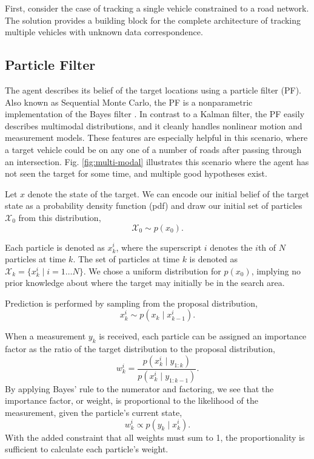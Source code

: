 \documentclass[letterpaper, 10 pt, conference]{ieeeconf}  %
\begin{document}
First, consider the case of tracking a single vehicle constrained to a road network. The solution provides a building block for the complete architecture of tracking multiple vehicles with unknown data correspondence.

\subsection{Particle Filter}

The agent describes its belief of the target locations using a particle filter (PF). Also known as Sequential Monte Carlo, the PF is a nonparametric implementation of the Bayes filter \cite{Arulampalam2002}. In contrast to a Kalman filter, the PF easily describes multimodal distributions, and it cleanly handles nonlinear motion and measurement models. These features are especially helpful in this scenario, where a target vehicle could be on any one of a number of roads after passing through an intersection. Fig. \ref{fig:multi-modal} illustrates this scenario where the agent has not seen the target for some time, and multiple good hypotheses exist.

Let $x$ denote the state of the target. We can encode our initial belief of the target state as a probability density function (pdf) and draw our initial set of particles $\mathcal{X}_0$ from this distribution,
\begin{equation}%
    \mathcal{X}_0 \sim p(x_0).
\end{equation}

Each particle is denoted as $x^i_k$, where the superscript $i$ denotes the $i$th of $N$ particles at time $k$. The set of particles at time $k$ is denoted as $\mathcal{X}_k = \{x^i_k \mid i = 1 \ldots N\}$. We chose a uniform distribution for $p(x_0)$, implying no prior knowledge about where the target may initially be in the search area.

Prediction is performed by sampling from the proposal distribution,
\begin{equation}\label{eq:proposal_dist}
    x^i_k \sim p(x_k \mid x^i_{k-1}).
\end{equation}

When a measurement $y_k$ is received, each particle can be assigned an importance factor as the ratio of the target distribution to the proposal distribution,
\begin{equation}%
    w^i_k = \frac{p(x^i_k \mid y_{1:k})}{p(x^i_k \mid y_{1:k-1})}.
\end{equation}
By applying Bayes' rule to the numerator and factoring, we see that the importance factor, or weight, is proportional to the likelihood of the measurement, given the particle's current state,
\begin{equation}%
    w^i_k \propto p(y_k \mid x^i_k).
\end{equation}
With the added constraint that all weights must sum to 1, the proportionality is sufficient to calculate each particle's weight.
\end{document}
